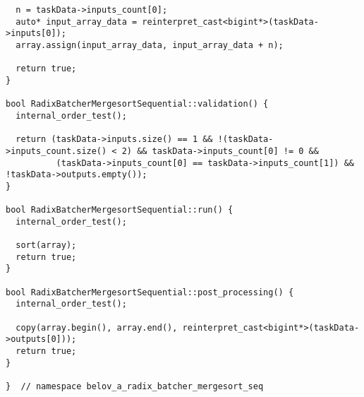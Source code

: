 ﻿\documentclass[a4paper,12pt]{article}
\begin{document}
\begin{lstlisting}
  n = taskData->inputs_count[0];
  auto* input_array_data = reinterpret_cast<bigint*>(taskData->inputs[0]);
  array.assign(input_array_data, input_array_data + n);

  return true;
}

bool RadixBatcherMergesortSequential::validation() {
  internal_order_test();

  return (taskData->inputs.size() == 1 && !(taskData->inputs_count.size() < 2) && taskData->inputs_count[0] != 0 &&
          (taskData->inputs_count[0] == taskData->inputs_count[1]) && !taskData->outputs.empty());
}

bool RadixBatcherMergesortSequential::run() {
  internal_order_test();

  sort(array);
  return true;
}

bool RadixBatcherMergesortSequential::post_processing() {
  internal_order_test();

  copy(array.begin(), array.end(), reinterpret_cast<bigint*>(taskData->outputs[0]));
  return true;
}

}  // namespace belov_a_radix_batcher_mergesort_seq

\end{lstlisting}
\end{document}
